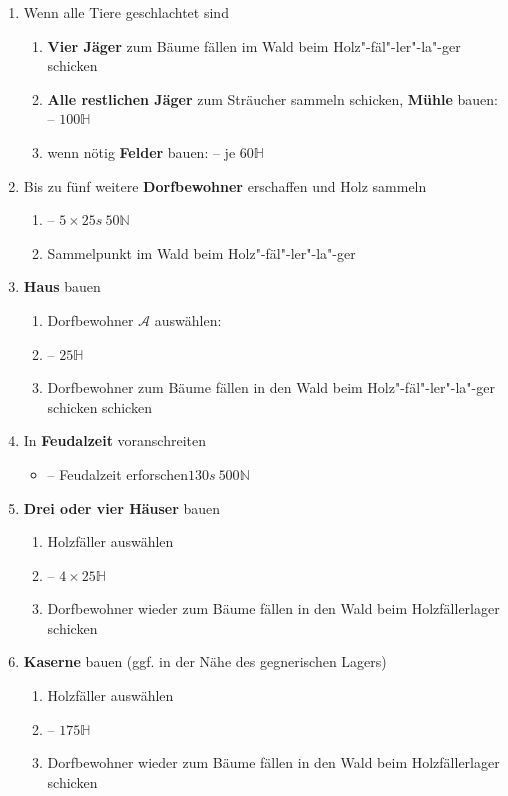 \documentclass[10pt,twocolumn,a4paper]{article}
\begin{document}
\begin{enumerate}
\item Wenn alle Tiere geschlachtet sind\begin{enumerate}\item \textbf{Vier Jäger} zum Bäume fällen im Wald beim Holz"-fäl"-ler"-la"-ger schicken \item \textbf{Alle restlichen Jäger} zum Sträucher sammeln schicken, \textbf{Mühle} bauen:  -- \hfill$100\mathbb H$\item wenn nötig \textbf{Felder} bauen:  -- \hfill je $60\mathbb H$\end{enumerate}
\item Bis zu fünf weitere \textbf{Dorfbewohner} erschaffen und Holz sammeln\begin{enumerate}\item {} -- \hfill$5\times 25s~50\mathbb N$\item Sammelpunkt im Wald beim Holz"-fäl"-ler"-la"-ger\end{enumerate}
\item \textbf{Haus} bauen\begin{enumerate}\item Dorfbewohner $\mathcal A$ auswählen:  \item{} -- \hfill$25\mathbb H$\item Dorfbewohner zum Bäume fällen in den Wald beim Holz"-fäl"-ler"-la"-ger schicken schicken\end{enumerate}
\item In \textbf{Feudalzeit} voranschreiten\begin{itemize}\item {} -- Feudalzeit erforschen\hfill$130s~500\mathbb N$\end{itemize}
\item \textbf{Drei oder vier Häuser} bauen\begin{enumerate}\item Holzfäller auswählen \item {} -- \hfill$4\times 25\mathbb H$\item Dorfbewohner wieder zum Bäume fällen in den Wald beim Holzfällerlager schicken\end{enumerate}
\item \textbf{Kaserne} bauen (ggf. in der Nähe des gegnerischen Lagers)\begin{enumerate}\item Holzfäller auswählen \item {} -- \hfill$175\mathbb H$\item Dorfbewohner wieder zum Bäume fällen in den Wald beim Holzfällerlager schicken\end{enumerate}
\end{enumerate}
\end{document}
